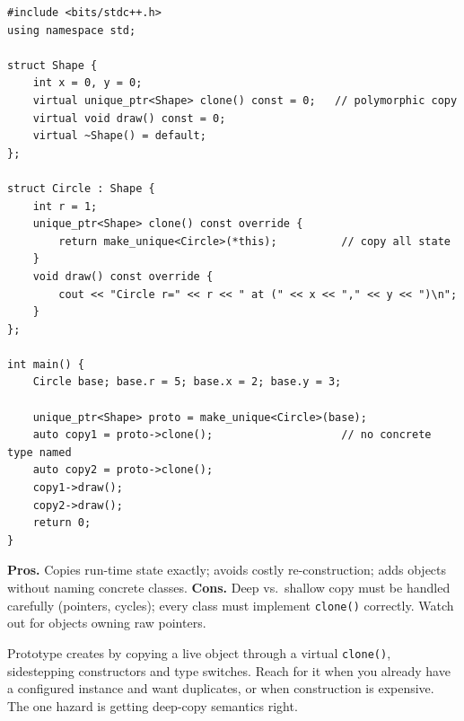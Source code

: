 \begin{lstlisting}
#include <bits/stdc++.h>
using namespace std;

struct Shape {
    int x = 0, y = 0;
    virtual unique_ptr<Shape> clone() const = 0;   // polymorphic copy
    virtual void draw() const = 0;
    virtual ~Shape() = default;
};

struct Circle : Shape {
    int r = 1;
    unique_ptr<Shape> clone() const override {
        return make_unique<Circle>(*this);          // copy all state
    }
    void draw() const override {
        cout << "Circle r=" << r << " at (" << x << "," << y << ")\n";
    }
};

int main() {
    Circle base; base.r = 5; base.x = 2; base.y = 3;

    unique_ptr<Shape> proto = make_unique<Circle>(base);
    auto copy1 = proto->clone();                    // no concrete type named
    auto copy2 = proto->clone();
    copy1->draw();
    copy2->draw();
    return 0;
}
\end{lstlisting}

\begin{complexitybox}
\textbf{Pros.} Copies run-time state exactly; avoids costly
re-construction; adds objects without naming concrete classes.
\textbf{Cons.} Deep vs.\ shallow copy must be handled carefully
(pointers, cycles); every class must implement \texttt{clone()}
correctly. Watch out for objects owning raw pointers.
\end{complexitybox}

\begin{takeawaybox}
Prototype creates by copying a live object through a virtual
\texttt{clone()}, sidestepping constructors and type switches. Reach for
it when you already have a configured instance and want duplicates, or
when construction is expensive. The one hazard is getting deep-copy
semantics right.
\end{takeawaybox}
